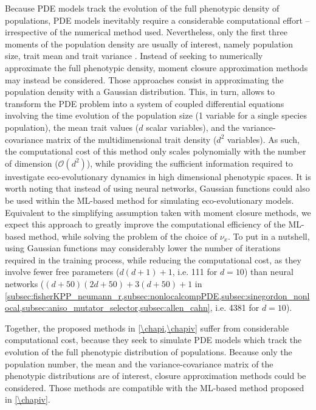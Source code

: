 Because PDE models track the evolution of the full phenotypic density of populations, PDE models inevitably require a considerable computational effort -- irrespective of the numerical method used. 
% 
Nevertheless, only the first three moments of the population density are usually of interest, namely population size, trait mean and trait variance \citep{Nordbotten2020}. 
% 
Instead of seeking to numerically approximate the full phenotypic density, moment closure approximation methods \citep{Wickman2021,Lion2022,Nordbotten2020} may instead be considered. Those approaches consist in approximating the population density with a Gaussian distribution. This, in turn, allows to transform the PDE problem into a system of coupled differential equations involving the time evolution of the population size (1 variable for a single species population), the mean trait values ($d$ scalar variables), and the variance-covariance matrix of the multidimensional trait density ($d^2$ variables). As such, the computational cost of this method only scales polynomially with the number of dimension ($\mathcal{O}(d^2)$), while providing the sufficient information required to investigate eco-evolutionary dynamics in high dimensional phenotypic spaces. 
% 
It is worth noting that instead of using neural networks, Gaussian functions could also be used within the ML-based method for simulating eco-evolutionary models. Equivalent to the simplifying assumption taken with moment closure methods, we expect this approach to greatly improve the computational efficiency of the ML-based method, while solving the problem of the choice of $\nu_x$. To put in a nutshell, using Gaussian functions may considerably lower the number of iterations required in the training process, while reducing the computational cost, as they involve fewer free parameters ($d(d+1) + 1$, i.e. 111 for $d=10$) than neural networks ($(d+50)(2d+50) + 3(d+50) + 1$ in \cref{subsec:fisherKPP_neumann_r,subsec:nonlocalcompPDE,subsec:sinegordon_nonlocal,subsec:aniso_mutator_selector,subsec:allen_cahn}, i.e. 4381 for $d=10$).

Together, the proposed methods in \cref{\chapi,\chapiv} suffer from considerable computational cost, because they seek to simulate PDE models which track the evolution of the full phenotypic distribution of populations. Because only the population number, the mean and the variance-covariance matrix of the phenotypic distributions are of interest, closure approximation methods could be considered. Those methods are compatible with the ML-based method proposed in \cref{\chapiv}.


